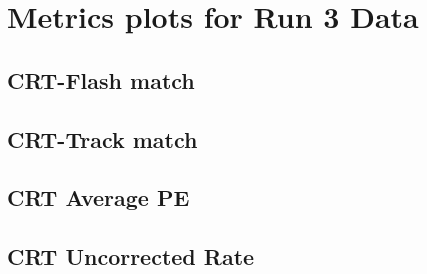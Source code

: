 \section{Metrics plots for Run 3 Data} \label{appendix:AllThePlots}
\subsection{CRT-Flash match} \label{appendix:Flash}
\subsection{CRT-Track match} \label{appendix:Track}
\subsection{CRT Average PE } \label{appendix:PE}
\subsection{CRT Uncorrected Rate} \label{appendix:Uncorrected}